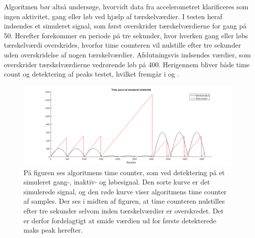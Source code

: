 Algoritmen bør altså undersøge, hvorvidt data fra accelerometret klarificeres som ingen aktivitet, gang eller løb ved hjælp af tærskelværdier. I testen heraf indsendes et simuleret signal, som først overskrider tærskelværdierne for gang på 50. Herefter forekommer en periode på tre sekunder, hvor hverken gang eller løbs tærskelværdi overskrides, hvorfor time counteren vil nulstille efter tre sekunder uden overskridelse af nogen tærskelværdier. Afslutningsvis indsendes værdier, som overskrider tærskelværdierne vedrørende løb på 400. Herigennem bliver både time count og detektering af peaks testet, hvilket fremgår i  og . 
\begin{figure}[H]
	\centering
	\includegraphics[scale=0.3]{figures/cDesign/test_timecount_inaktiv.png}
	\caption{På figuren ses algoritmens time counter, som ved detektering på et simuleret gang-, inaktiv- og løbesignal. Den sorte kurve er det simulerede signal, og den røde kurve viser algoritmens time counter af samples. Der ses i midten af figuren, at time counteren nulstilles efter tre sekunder selvom inden tærskelværdier er overskredet. Det er derfor fordelagtigt at smide værdien ud for første detekterede maks peak herefter.}
	\label{fig:test_inaktiv_time}
\end{figure}

